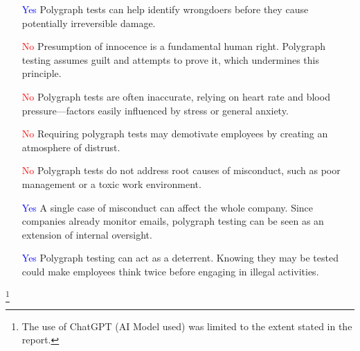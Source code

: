 \documentclass[12pt]{article}
\begin{document}
\begin{itemize}
    \item [\textcolor{blue}{Yes}] Polygraph tests can help identify wrongdoers before they cause potentially irreversible damage.
    \item [\textcolor{red}{No}] Presumption of innocence is a fundamental human right. Polygraph testing assumes guilt and attempts to prove it, which undermines this principle.
    \item [\textcolor{red}{No}] Polygraph tests are often inaccurate, relying on heart rate and blood pressure—factors easily influenced by stress or general anxiety.
    \item [\textcolor{red}{No}] Requiring polygraph tests may demotivate employees by creating an atmosphere of distrust.
    \item [\textcolor{red}{No}] Polygraph tests do not address root causes of misconduct, such as poor management or a toxic work environment.
    \item [\textcolor{blue}{Yes}] A single case of misconduct can affect the whole company. Since companies already monitor emails, polygraph testing can be seen as an extension of internal oversight.
    \item [\textcolor{blue}{Yes}] Polygraph testing can act as a deterrent. Knowing they may be tested could make employees think twice before engaging in illegal activities.
\end{itemize}
\footnote{The use of ChatGPT (AI Model used) was limited to the extent stated in the report.}
\pagebreak


\end{document}
